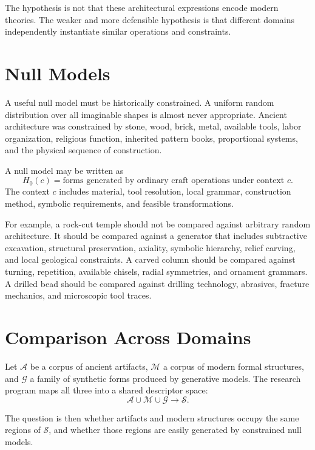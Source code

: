 \documentclass[11pt,a4paper]{article}
\begin{document}
The hypothesis is not that these architectural expressions encode modern theories. The weaker and more defensible hypothesis is that different domains independently instantiate similar operations and constraints.

\section{Null Models}

A useful null model must be historically constrained. A uniform random distribution over all imaginable shapes is almost never appropriate. Ancient architecture was constrained by stone, wood, brick, metal, available tools, labor organization, religious function, inherited pattern books, proportional systems, and the physical sequence of construction.

A null model may be written as
\begin{equation}
    H_0(c)=\text{forms generated by ordinary craft operations under context }c.
\end{equation}
The context $c$ includes material, tool resolution, local grammar, construction method, symbolic requirements, and feasible transformations.

For example, a rock-cut temple should not be compared against arbitrary random architecture. It should be compared against a generator that includes subtractive excavation, structural preservation, axiality, symbolic hierarchy, relief carving, and local geological constraints. A carved column should be compared against turning, repetition, available chisels, radial symmetries, and ornament grammars. A drilled bead should be compared against drilling technology, abrasives, fracture mechanics, and microscopic tool traces.

\section{Comparison Across Domains}

Let $\mathcal{A}$ be a corpus of ancient artifacts, $\mathcal{M}$ a corpus of modern formal structures, and $\mathcal{G}$ a family of synthetic forms produced by generative models. The research program maps all three into a shared descriptor space:
\begin{equation}
    \mathcal{A}\cup\mathcal{M}\cup\mathcal{G}\longrightarrow \mathcal{S}.
\end{equation}

The question is then whether artifacts and modern structures occupy the same regions of $\mathcal{S}$, and whether those regions are easily generated by constrained null models.
\end{document}
